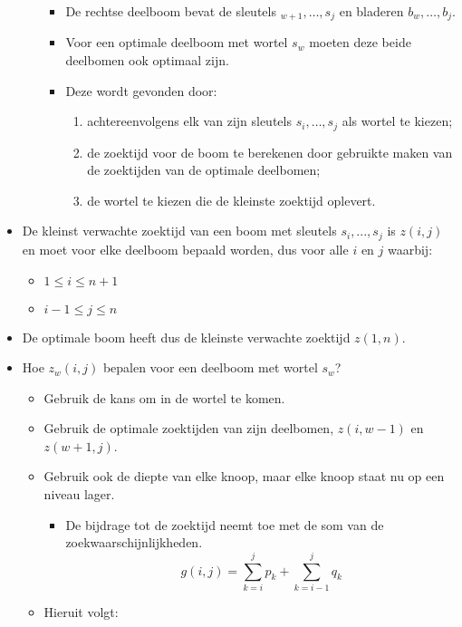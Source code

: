 \begin{itemize}
\begin{itemize}
\begin{itemize}
            \item De rechtse deelboom bevat de sleutels $_{w + 1}, \dots, s_j$ en bladeren $b_{w}, \dots, b_j$.
            \item Voor een optimale deelboom met wortel $s_w$ moeten deze beide deelbomen ook optimaal zijn.
            \item Deze wordt gevonden door:
            \begin{enumerate}
                \item achtereenvolgens elk van zijn sleutels $s_i, \dots, s_j$ als wortel te kiezen;
                \item de zoektijd voor de boom te berekenen door gebruikte maken van de zoektijden van de optimale deelbomen;
                \item de wortel te kiezen die de kleinste zoektijd oplevert.
            \end{enumerate} 
        \end{itemize}
    \end{itemize}
    \item De kleinst verwachte zoektijd van een boom met sleutels $s_i, ..., s_j$ is $z(i, j)$ en moet voor elke deelboom bepaald worden, dus voor alle $i$ en $j$ waarbij:
    \begin{itemize}
        \item $1 \leq i \leq n + 1$
        \item $i - 1 \leq j \leq n$
    \end{itemize}
    \item De optimale boom heeft dus de kleinste verwachte zoektijd $z(1, n)$.
    \item Hoe $z_w(i, j)$ bepalen voor een deelboom met wortel $s_w$?
    \begin{itemize}
        \item Gebruik de kans om in de wortel te komen.
        \item Gebruik de optimale zoektijden van zijn deelbomen, $z(i, w - 1)$ en $z(w + 1, j)$.
        \item Gebruik ook de diepte van elke knoop, maar elke knoop staat nu op een niveau lager. 
        \begin{itemize}
            \item De bijdrage tot de zoektijd neemt toe met de som van de zoekwaarschijnlijkheden.
            $$g(i, j) = \sum_{k = i}^{j} p_k + \sum_{k = i - 1}^{j} q_k$$
        \end{itemize}
        \item Hieruit volgt:

\end{itemize}
\end{itemize}
